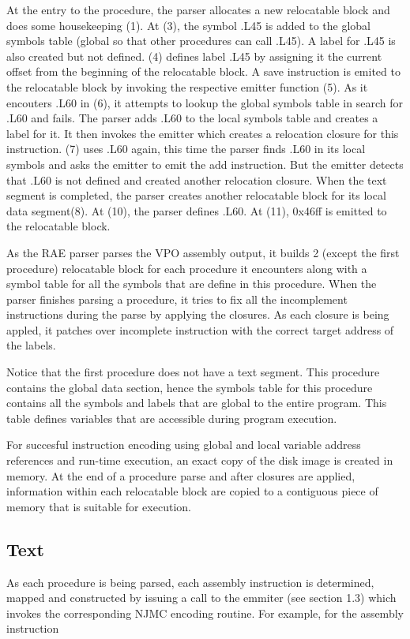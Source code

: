 At the entry to the procedure, the parser allocates a new relocatable
block and does some housekeeping (1).  At (3), the symbol .L45 is added to
the global symbols table (global so that other procedures can call .L45). 
A label for .L45 is also created but not defined.  (4) defines label .L45
by assigning it the current offset from the beginning of the relocatable
block.  A save instruction is emited to the relocatable block by invoking
the respective emitter function (5).  As it encouters .L60 in (6), it
attempts to lookup the global symbols table in search for .L60 and fails. 
The parser adds .L60 to the local symbols table and creates a label for
it.  It then invokes the emitter which creates a relocation closure for
this instruction.  (7) uses .L60 again, this time the parser finds .L60 in
its local symbols and asks the emitter to emit the add instruction.  But
the emitter detects that .L60 is not defined and created another
relocation closure.  When the text segment is completed, the parser
creates another relocatable block for its local data segment(8).  At (10),
the parser defines .L60.  At (11), 0x46ff is emitted to the relocatable
block. 

As the RAE parser parses the VPO assembly output, it builds 2 (except the
first procedure) relocatable block for each procedure it encounters along
with a symbol table for all the symbols that are define in this procedure. 
When the parser finishes parsing a procedure, it tries to fix all the
incomplement instructions during the parse by applying the closures.  As
each closure is being appled, it patches over incomplete instruction with
the correct target address of the labels. 

Notice that the first procedure does not have a text segment.  This
procedure contains the global data section, hence the symbols table for
this procedure contains all the symbols and labels that are global to the
entire program.  This table defines variables that are accessible during
program execution. 

For succesful instruction encoding using global and local variable address
references and run-time execution, an exact copy of the disk image is
created in memory.  At the end of a procedure parse and after closures are
applied, information within each relocatable block are copied to a
contiguous piece of memory that is suitable for execution. 


\subsection{Text} 
As each procedure is being parsed, each assembly
instruction is determined, mapped and constructed by issuing a call to the
emmiter (see section 1.3) which invokes the corresponding NJMC encoding routine.  For example, for the assembly instruction 

